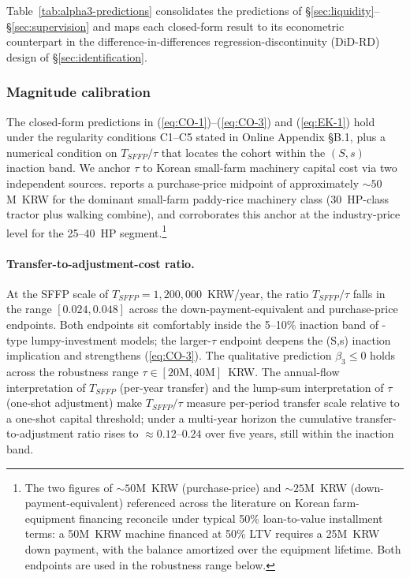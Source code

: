 \documentclass[12pt, a4paper]{article}
\begin{document}
Table~\ref{tab:alpha3-predictions} consolidates the predictions of \S\ref{sec:liquidity}--\S\ref{sec:supervision} and maps each closed-form result to its econometric counterpart in the difference-in-differences regression-discontinuity (DiD-RD) design of \S\ref{sec:identification}.


\subsubsection*{Magnitude calibration}
\label{sec:calibration}

The closed-form predictions in (\ref{eq:CO-1})--(\ref{eq:CO-3}) and (\ref{eq:EK-1}) hold under the regularity conditions C1--C5 stated in Online Appendix \S B.1, plus a numerical condition on $T_{SFFP}/\tau$ that locates the cohort within the $(S,s)$ inaction band. We anchor $\tau$ to Korean small-farm machinery capital cost via two independent sources. \citet{KREI_prodcost_2022} reports a purchase-price midpoint of approximately ${\sim}50$M~KRW for the dominant small-farm paddy-rice machinery class (30~HP-class tractor plus walking combine), and \citet{KAMICO_pricelist_2022} corroborates this anchor at the industry-price level for the 25--40~HP segment.\footnote{The two figures of ${\sim}50$M~KRW (purchase-price) and ${\sim}25$M~KRW (down-payment-equivalent) referenced across the literature on Korean farm-equipment financing reconcile under typical 50\% loan-to-value installment terms: a 50M~KRW machine financed at 50\% LTV requires a 25M~KRW down payment, with the balance amortized over the equipment lifetime. Both endpoints are used in the robustness range below.}

\paragraph{Transfer-to-adjustment-cost ratio.} At the SFFP scale of $T_{SFFP} = 1{,}200{,}000$~KRW/year, the ratio $T_{SFFP}/\tau$ falls in the range $[0.024, 0.048]$ across the down-payment-equivalent and purchase-price endpoints. Both endpoints sit comfortably inside the 5--10\% inaction band of \citet{CaballeroEngel1999_lumpy}-type lumpy-investment models; the larger-$\tau$ endpoint deepens the (S,s) inaction implication and strengthens (\ref{eq:CO-3}). The qualitative prediction $\beta_3 \le 0$ holds across the robustness range $\tau \in [20\text{M}, 40\text{M}]$~KRW. The annual-flow interpretation of $T_{SFFP}$ (per-year transfer) and the lump-sum interpretation of $\tau$ (one-shot adjustment) make $T_{SFFP}/\tau$ measure per-period transfer scale relative to a one-shot capital threshold; under a multi-year horizon the cumulative transfer-to-adjustment ratio rises to $\approx 0.12$--$0.24$ over five years, still within the inaction band.
\end{document}
